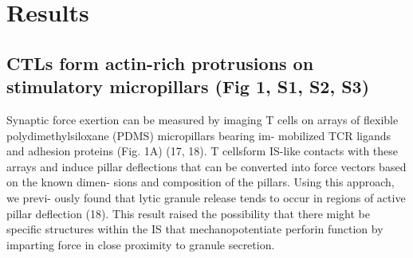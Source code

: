 \section{Results} 

\subsection{CTLs form actin-rich protrusions on stimulatory micropillars (Fig 1, S1, S2, S3)}
Synaptic force exertion can be measured by imaging T cells on arrays of flexible polydimethylsiloxane (PDMS) micropillars bearing im- mobilized TCR ligands and adhesion proteins (Fig. 1A) (17, 18). T cellsform IS-like contacts with these arrays and induce pillar deflections that can be converted into force vectors based on the known dimen-
sions and composition of the pillars. Using this approach, we previ- ously found that lytic granule release tends to occur in regions of active pillar deflection (18). This result raised the possibility that there might be specific structures within the IS that mechanopotentiate perforin function by imparting force in close proximity to granule secretion.

